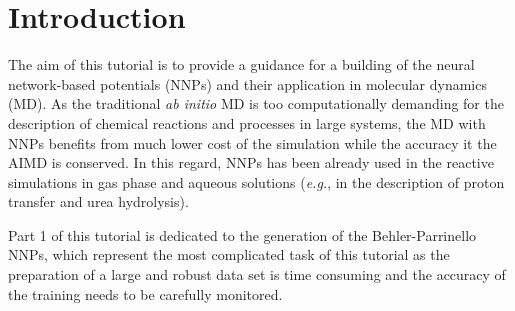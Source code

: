 \documentclass[12pt]{article}
\begin{document}

\newpage
\tableofcontents

\newpage
\pagestyle{fancy}
\renewcommand\headrulewidth{1pt}
\renewcommand\footrulewidth{1pt}
\fancyfoot[C]{\thepage}
\fancyfoot[R]{\today}
\section{Introduction}
The aim of this tutorial is to provide a guidance for a building of the neural network-based potentials (NNPs) and their application in molecular dynamics (MD). As the traditional \textit{ab initio} MD is too computationally demanding for the description of chemical reactions and processes in large systems, the MD with NNPs benefits from much lower cost of the simulation while the accuracy it the AIMD is conserved.  %
In this regard, NNPs has been already used in the reactive simulations in gas phase and aqueous solutions (\textit{e.g.}, in the description of proton transfer and urea hydrolysis). %

Part 1 of this tutorial is dedicated to the generation of the Behler-Parrinello NNPs, which represent the most complicated task of this tutorial as the preparation of a large and robust data set is time consuming and the accuracy of the training needs to be carefully monitored.
\end{document}
